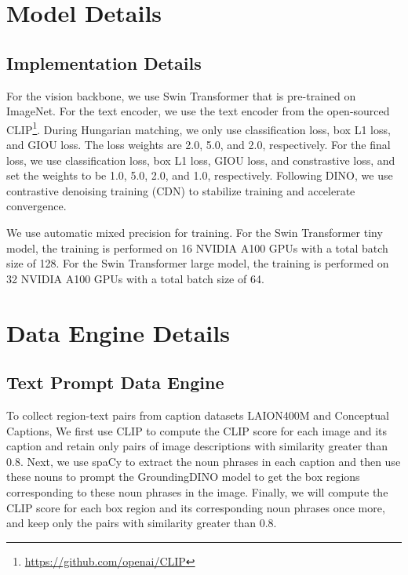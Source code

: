 \clearpage

\renewcommand{\thesection}{\Alph{section}} %
\setcounter{section}{0} %
\setcounter{table}{0}
\setcounter{figure}{0}
\maketitlesupplementary


\section{Model Details}
\subsection{Implementation Details}
For the vision backbone, we use Swin Transformer that is pre-trained on ImageNet. For the text encoder, we use the text encoder from the open-sourced CLIP\footnote{\url{https://github.com/openai/CLIP}}. During Hungarian matching, we only use classification loss, box L1 loss, and GIOU loss. The loss weights are 2.0, 5.0, and 2.0, respectively. For the final loss, we use classification loss, box L1 loss, GIOU loss, and constrastive loss, and set the weights to be 1.0, 5.0, 2.0, and 1.0, respectively. Following DINO, we use contrastive denoising training (CDN) to stabilize training and accelerate convergence.

We use automatic mixed precision for training. For the Swin Transformer tiny model, the training is performed on 16 NVIDIA A100 GPUs with a total batch size of 128. For the Swin Transformer large model, the training is performed on 32 NVIDIA A100 GPUs with a total batch size of 64.

\section{Data Engine Details}
\subsection{Text Prompt Data Engine}
To collect region-text pairs from caption datasets LAION400M and Conceptual Captions, We first use CLIP to compute the CLIP score for each image and its caption and retain only pairs of image descriptions with similarity greater than 0.8. Next, we use spaCy to extract the noun phrases in each caption and then use these nouns to prompt the GroundingDINO model to get the box regions corresponding to these noun phrases in the image. Finally, we will compute the CLIP score for each box region and its corresponding noun phrases once more, and keep only the pairs with similarity greater than 0.8.

